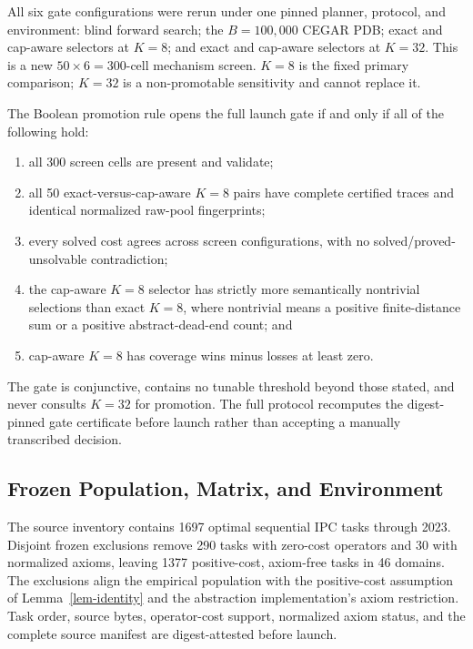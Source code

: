 All six gate configurations were rerun under one pinned planner, protocol, and
environment: blind forward search; the \(B=100{,}000\) CEGAR PDB; exact and
cap-aware selectors at \(K=8\); and exact and cap-aware selectors at \(K=32\).
This is a new \(50\times6=300\)-cell mechanism screen.  \(K=8\) is the fixed
primary comparison; \(K=32\) is a non-promotable sensitivity and cannot replace
it.

The Boolean promotion rule opens the full launch gate if and only if all of the
following hold:

\begin{enumerate}
  \item all 300 screen cells are present and validate;
  \item all 50 exact-versus-cap-aware \(K=8\) pairs have complete certified
    traces and identical normalized raw-pool fingerprints;
  \item every solved cost agrees across screen configurations, with no
    solved/proved-unsolvable contradiction;
  \item the cap-aware \(K=8\) selector has strictly more semantically
    nontrivial selections than exact \(K=8\), where nontrivial means a positive
    finite-distance sum or a positive abstract-dead-end count; and
  \item cap-aware \(K=8\) has coverage wins minus losses at least zero.
\end{enumerate}

The gate is conjunctive, contains no tunable threshold beyond those stated,
and never consults \(K=32\) for promotion.  The full protocol recomputes the
digest-pinned gate certificate before launch rather than accepting a manually
transcribed decision.

\subsection{Frozen Population, Matrix, and Environment}

The source inventory contains 1697 optimal sequential IPC tasks through 2023.
Disjoint frozen exclusions remove 290 tasks with zero-cost operators and 30
with normalized axioms, leaving 1377 positive-cost, axiom-free tasks in 46
domains.  The exclusions align the empirical population with the positive-cost
assumption of Lemma~\ref{lem-identity} and the abstraction implementation's
axiom restriction.  Task order, source bytes, operator-cost support, normalized
axiom status, and the complete source manifest are digest-attested before
launch.

